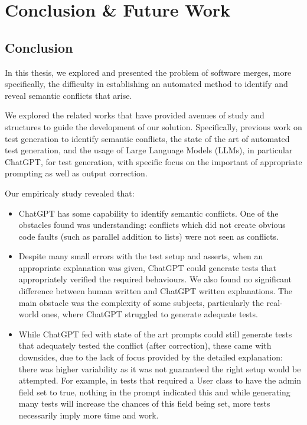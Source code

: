 \chapter{Conclusion \& Future Work}\label{chap:conclusion}

\section{Conclusion}

In this thesis, we explored and presented the problem of software merges, more specifically, the difficulty in establishing an automated method to identify and reveal semantic conflicts that arise.

We explored the related works that have provided avenues of study and structures to guide the development of our solution. Specifically, previous work on test generation to identify semantic conflicts, the state of the art of automated test generation, and the usage of Large Language Models (LLMs), in particular ChatGPT, for test generation, with specific focus on the important of appropriate prompting as well as output correction.

Our empiricaly study revealed that:
%
\begin{itemize}
  \item %
  ChatGPT has some capability to identify semantic conflicts. One of the obstacles found was understanding:
conflicts which did not create obvious code faults (such as parallel addition to lists) were not seen as conflicts. 

  \item %
  Despite many small errors with the test setup and asserts, when an appropriate explanation was given, ChatGPT could generate
tests that appropriately verified the required behaviours. We also found no significant difference between human written and ChatGPT written explanations. The main obstacle
was the complexity of some subjects, particularly the real-world ones, where ChatGPT struggled to generate adequate tests.

  \item %
  While ChatGPT fed with state of the art prompts could still generate tests that adequately tested the conflict (after correction),
these came with downsides, due to the lack of focus provided by the detailed explanation: there was higher variability as it was not guaranteed the right setup would be attempted.
For example, in tests that required a User class to have the admin field set to true, nothing in the prompt indicated this and while generating many tests will increase the chances
of this field being set, more tests necessarily imply more time and work.
\end{itemize}

